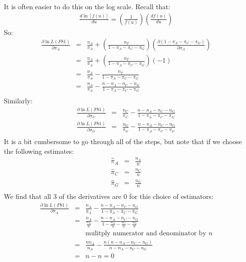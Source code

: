 \documentclass[11pt]{article}
\begin{document}
It is often easier to do this on the log scale.
Recall that:
\begin{eqnarray*}
\frac{d\ln[f(u)]}{du} = \left(\frac{1}{f(u)}\right)\left(\frac{df(u)}{du}\right)
\end{eqnarray*}
So:
\begin{eqnarray*}
\frac{\partial\ln L(F81)}{\partial \pi_A}  & = & \frac{n_A}{\pi_A} + \left(\frac{n_T}{1 - \pi_A- \pi_C- \pi_G}\right)\left(\frac{\partial(1 - \pi_A- \pi_C- \pi_G)}{\partial \pi_A}\right) \\
& = & \frac{n_A}{\pi_A} + \left(\frac{n_T}{1 - \pi_A- \pi_C- \pi_G}\right)\left(-1\right) \\
& = & \frac{n_A}{\pi_A} - \frac{n_T}{1 - \pi_A- \pi_C- \pi_G} \\
& = & \frac{n_A}{\pi_A} - \frac{n - n_A - n_C - n_G}{1 - \pi_A- \pi_C- \pi_G} \\
\end{eqnarray*}
Similarly:
\begin{eqnarray*}
\frac{\partial\ln L(F81)}{\partial \pi_C}  & = & \frac{n_C}{\pi_C} - \frac{n - n_A - n_C - n_G}{1 - \pi_A- \pi_C- \pi_G} \\
\frac{\partial\ln L(F81)}{\partial \pi_G}  & = & \frac{n_G}{\pi_G} - \frac{n - n_A - n_C - n_G}{1 - \pi_A- \pi_C- \pi_G} \\
\end{eqnarray*}
It is a bit cumbersome to go through all of the steps, but note that if we choose the following estimates:
\begin{eqnarray*}
\hat{\pi}_A & = & \frac{n_A}{n} \\
\hat{\pi}_C & = & \frac{n_C}{n} \\
\hat{\pi}_G & = & \frac{n_G}{n} \\
\end{eqnarray*}
We find that all 3 of the derivatives are 0 for this choice of estimators:
\begin{eqnarray*}
\frac{\partial\ln L(F81)}{\partial \pi_A} & = & \frac{n_A}{\hat{\pi}_A} - \frac{n - n_A - n_C - n_G}{1 - \hat{\pi}_A- \hat{\pi}_C- \hat{\pi}_G}\\
& = & \frac{n_A}{\frac{n_A}{n}} - \frac{n - n_A - n_C - n_G}{1 - \frac{n_A}{n}- \frac{n_C}{n}- \frac{n_G}{n}}\\
& & \mbox{mulitply numerator and denominator by }n\\
& = & \frac{n n_A}{n_A} - \frac{n(n - n_A - n_C - n_G)}{n - {n_A} - {n_C} - {n_G} }\\
& = & n - n = 0
\end{eqnarray*}
\end{document}
